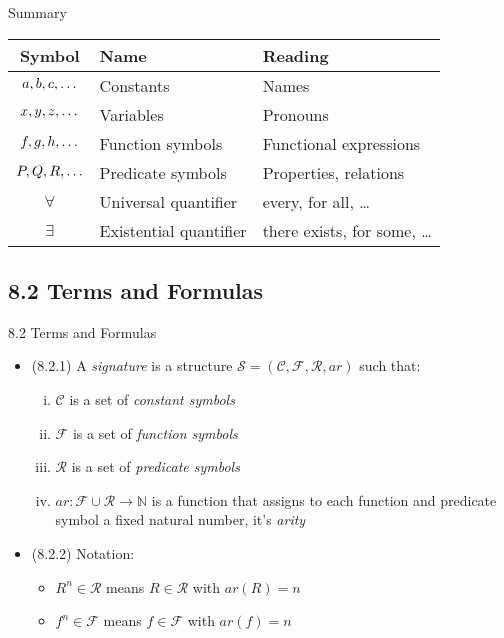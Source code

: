 \begin{frame}{Summary}

	\begin{tabular}{c | l | l}
	Symbol & Name & Reading\\\hline
	$a,b,c,\mathellipsis$ & Constants & Names\\
	$x,y,z,\mathellipsis$ & Variables & Pronouns\\
	$f,g,h, \mathellipsis$ & Function symbols & Functional expressions\\
	$P,Q,R,\mathellipsis$ & Predicate symbols & Properties, relations\\
	$\forall $ & Universal quantifier & every, for all, \dots\\
	$\exists$ & Existential quantifier & there exists, for some, \dots
	\end{tabular}


\end{frame}

\subsection{8.2 Terms and Formulas}
\begin{frame}{8.2 Terms and Formulas}

	\begin{itemize}%
	\itemsep=16pt
	
		\item (8.2.1) A \emph{signature} is a structure $\mathcal{S}=(\mathcal{C}, \mathcal{F}, \mathcal{R}, ar)$ such that:
		\begin{enumerate}[(i)]
		
			\item $\mathcal{C}$ is a set of \emph{constant symbols}
			
			\item $\mathcal{F}$ is a set of \emph{function symbols}
			
			\item $\mathcal{R}$ is a set of \emph{predicate symbols}
			
			\item $ar:\mathcal{F}\cup\mathcal{R}\to\mathbb{N}$ is a function that assigns to each function and predicate symbol a fixed natural number, it's \emph{arity}
		\end{enumerate}

	\item (8.2.2) Notation:
	
		\begin{itemize}
		
			\item $R^n\in\mathcal{R}$ means $R\in\mathcal{R}$ with $ar(R)=n$
			\item $f^n\in\mathcal{F}$ means $f\in\mathcal{F}$ with $ar(f)=n$
		
		\end{itemize}
	
	\end{itemize}

\end{frame}

